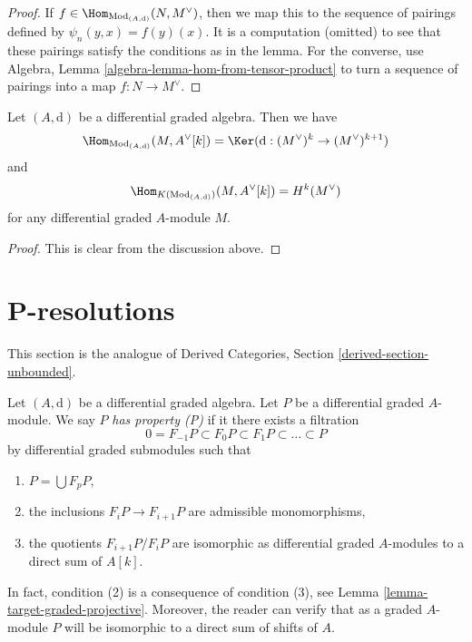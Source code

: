 \begin{proof}
If $f \in \Hom_{\text{Mod}_{(A, \text{d})}}(N, M^\vee)$, then we
map this to the sequence of pairings defined by
$\psi_n(y, x) = f(y)(x)$. It is a computation (omitted) to see
that these pairings satisfy the conditions as in the lemma.
For the converse, use
Algebra, Lemma \ref{algebra-lemma-hom-from-tensor-product} to turn a sequence
of pairings into a map $f : N \to M^\vee$.
\end{proof}

\begin{lemma}
\label{lemma-hom-into-shift-dual-free}
Let $(A, \text{d})$ be a differential graded algebra. Then we have
$$
\Hom_{\text{Mod}_{(A, \text{d})}}(M, A^\vee[k]) =
\Ker(\text{d} : (M^\vee)^k \to (M^\vee)^{k + 1})
$$
and
$$
\Hom_{K(\text{Mod}_{(A, \text{d})})}(M, A^\vee[k]) = H^k(M^\vee)
$$
for any differential graded $A$-module $M$.
\end{lemma}

\begin{proof}
This is clear from the discussion above.
\end{proof}















\section{P-resolutions}
\label{section-P-resolutions}

\noindent
This section is the analogue of
Derived Categories, Section \ref{derived-section-unbounded}.

\medskip\noindent
Let $(A, \text{d})$ be a differential graded algebra.
Let $P$ be a differential graded $A$-module. We say $P$
{\it has property (P)} if it there exists a filtration
$$
0 = F_{-1}P \subset F_0P \subset F_1P \subset \ldots \subset P
$$
by differential graded submodules such that
\begin{enumerate}
\item $P = \bigcup F_pP$,
\item the inclusions $F_iP \to F_{i + 1}P$ are admissible
monomorphisms,
\item the quotients $F_{i + 1}P/F_iP$ are isomorphic as differential
graded $A$-modules to a direct sum of $A[k]$.
\end{enumerate}
In fact, condition (2) is a consequence of condition (3), see
Lemma \ref{lemma-target-graded-projective}. Moreover, the reader
can verify that as a graded $A$-module $P$ will be isomorphic to a
direct sum of shifts of $A$.

